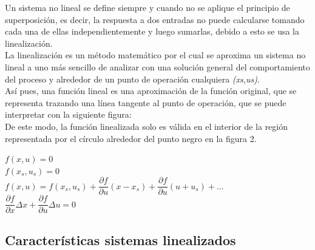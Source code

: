 \documentclass[a4paper,12pt,twoside]{proyectotanquesecci}
\begin{document}
Un sistema no lineal se define siempre y cuando no se aplique el principio de superposición, es decir, la respuesta a dos entradas no puede calcularse tomando cada una de ellas independientemente y luego sumarlas, debido a esto se usa la linealización.\\


La linealización es un método matemático por el cual se aproxima un sistema no lineal a uno más sencillo de analizar con una solución general del comportamiento del proceso y alrededor de un punto de operación cualquiera \textit{(xs,us)}.\\

Así pues, una función lineal es una aproximación de la función original, que se representa trazando una línea tangente al punto de operación, que se puede interpretar con la siguiente figura:\\


De este modo, la función linealizada solo es válida en el interior de la región representada por el círculo alrededor del punto negro en la figura 2.\\

\begin{center}
	$f\left( x,u\right)=0$\\
	$f\left( x_{s},u_{s}\right) =0$\\
	$f\left( x,u\right) = f\left( x_{s},u_{s}\right) +\dfrac {\partial f}{\partial u}\left( x-x_{s}\right) +\dfrac {\partial f}{\partial u}\left( u+u_{s}\right) +\ldots$\\
	$\dfrac {\partial f}{\partial x}\Delta x+\dfrac {\partial f}{\partial u}\Delta u=0$
\end{center}

\subsection{Características sistemas linealizados}
\end{document}
